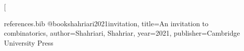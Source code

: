 
\renewcommand{\labelenumi}{\alph{enumi})}
\newcommand{\Z}{\mathbb Z}
\newcommand{\R}{\mathbb R}
\newcommand{\Q}{\mathbb Q}
\newcommand{\NN}{\mathbb N}
\newcommand{\PP}{\mathbb P}
\DeclareMathOperator{\Mod}{Mod} 
\renewcommand\lstlistingname{Algorithm}
\renewcommand\lstlistlistingname{Algorithms}
\def\lstlistingautorefname{Alg.}
\newtheorem*{theorem}{Theorem}
\newtheorem*{lemma}{Lemma}
\newtheorem{case}{Case}
\newcommand{\assign}{:=}
\newcommand{\infixiff}{\text{ iff }}
\newcommand{\nobracket}{}
\newcommand{\backassign}{=:}
\newcommand{\tmmathbf}[1]{\ensuremath{\boldsymbol{#1}}}
\newcommand{\tmop}[1]{\ensuremath{\operatorname{#1}}}
\newcommand{\tmtextbf}[1]{\text{{\bfseries{#1}}}}
\newcommand{\tmtextit}[1]{\text{{\itshape{#1}}}}

\newcommand*{\mkbibnextfootnotetext}[1]{\nextfootnotetext{\blxmkbibnote{foot}{#1}}}
\DeclareCiteCommand{\footcitetext}[\mkbibnextfootnotetext]
  {}
  {%
    }
  {\multicitedelim}
  {}

\makeatletter
\renewcommand*\env@matrix[2][1.0]{%
  \edef\arraystretch{#1}%
  \hskip -\arraycolsep
  \let\@ifnextchar\new@ifnextchar
  \array{#2}
}
\makeatother

\theoremstyle{definition}
\allowdisplaybreaks
\newtheorem{dinhly}{Định lý}
\newtheorem{dinhnghia}{Định nghĩa}
\newtheorem{vidu}{Ví dụ}
\newtheorem{hequa}{Hệ quả}
\newtheorem{bode}{Bổ đề}
\newtheorem{baitoan}{Bài toán}
\newtheorem{luuy}{Lưu ý}
\newtheorem{nhanxet}{Nhận xét}

\begin{filecontents}{references.bib}
  @book{shahriari2021invitation,
    title={An invitation to combinatorics},
    author={Shahriari, Shahriar},
    year={2021},
    publisher={Cambridge University Press}
  }
\end{filecontents}

\newcommand{\genstirlingI}[3]{%
	\genfrac{[}{]}{0pt}{#1}{#2}{#3}%
}
\newcommand{\genstirlingII}[3]{%
	\genfrac{\{}{\}}{0pt}{#1}{#2}{#3}%
}
\newcommand{\stirlingI}[2]{\genstirlingI{}{#1}{#2}}
\newcommand{\dstirlingI}[2]{\genstirlingI{0}{#1}{#2}}
\newcommand{\tstirlingI}[2]{\genstirlingI{1}{#1}{#2}}
\newcommand{\stirlingII}[2]{\genstirlingII{}{#1}{#2}}
\newcommand{\dstirlingII}[2]{\genstirlingII{0}{#1}{#2}}
\newcommand{\tstirlingII}[2]{\genstirlingII{1}{#1}{#2}}

\setlength\parindent{0pt}
\def\multiset#1#2{\ensuremath{\left(\kern-.3em\left(\genfrac{}{}{0pt}{}{#1}{#2}\right)\kern-.3em\right)}}


